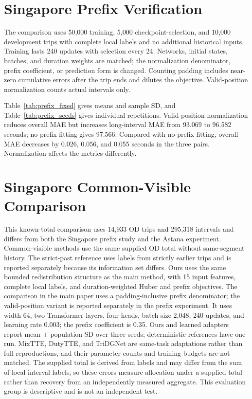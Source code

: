\documentclass[journal]{IEEEtran}
\begin{document}
\section{Singapore Prefix Verification}


The comparison uses 50,000 training, 5,000 checkpoint-selection, and 10,000 development trips with complete local labels and no additional historical inputs. Training lasts 240 updates with selection every 24. Networks, initial states, batches, and duration weights are matched; the normalization denominator, prefix coefficient, or prediction form is changed. Counting padding includes near-zero cumulative errors after the trip ends and dilutes the objective. Valid-position normalization counts actual intervals only.

Table~\ref{tab:prefix_fixed} gives means and sample SD, and Table~\ref{tab:prefix_seeds} gives individual repetitions. Valid-position normalization reduces overall MAE but increases long-interval MAE from 93.069 to 96.582 seconds; no-prefix fitting gives 97.566. Compared with no-prefix fitting, overall MAE decreases by 0.026, 0.056, and 0.055 seconds in the three pairs. Normalization affects the metrics differently.

\section{Singapore Common-Visible Comparison}\label{sec:singapore-common-visible}
This known-total comparison uses 14,933 OD trips and 295,318 intervals and differs from both the Singapore prefix study and the Astana experiment. Common-visible methods use the same supplied OD total without same-segment history. The strict-past reference uses labels from strictly earlier trips and is reported separately because its information set differs. Ours uses the same bounded redistribution structure as the main method, with 15 input features, complete local labels, and duration-weighted Huber and prefix objectives. The comparison in the main paper uses a padding-inclusive prefix denominator; the valid-position variant is reported separately in the prefix experiment. It uses width 64, two Transformer layers, four heads, batch size 2,048, 240 updates, and learning rate 0.003; the prefix coefficient is 0.35. Ours and learned adapters report mean $\pm$ population SD over three seeds; deterministic references have one run. MixTTE, DutyTTE, and TriDGNet\cite{jiang2026mixtte,mao2025dutytte,zuo2026tridgnet} are same-task adaptations rather than full reproductions, and their parameter counts and training budgets are not matched. The supplied total is derived from labels and may differ from the sum of local interval labels, so these errors measure allocation under a supplied total rather than recovery from an independently measured aggregate. This evaluation group is descriptive and is not an independent test.
\end{document}
